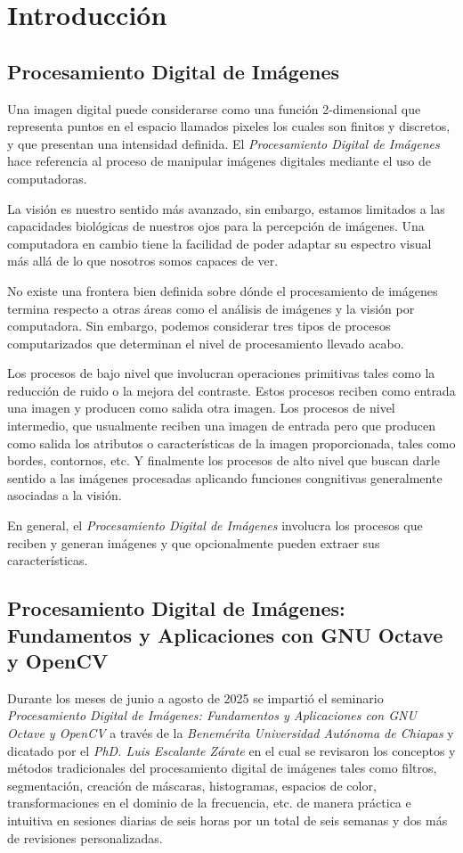 \chapter{Introducción}

\section{Procesamiento Digital de Imágenes}
Una imagen digital puede considerarse como una función 2-dimensional que representa puntos en el espacio llamados pixeles los cuales son finitos y discretos, y que presentan una intensidad definida. El \textit{Procesamiento Digital de Imágenes} hace referencia al proceso de manipular imágenes digitales mediante el uso de computadoras.

La visión es nuestro sentido más avanzado, sin embargo, estamos limitados a las capacidades biológicas de nuestros ojos para la percepción de imágenes. Una computadora en cambio tiene la facilidad de poder adaptar su espectro visual más allá de lo que nosotros somos capaces de ver.

No existe una frontera bien definida sobre dónde el procesamiento de imágenes termina respecto a otras áreas como el análisis de imágenes y la visión por computadora. Sin embargo, podemos considerar tres tipos de procesos computarizados que determinan el nivel de procesamiento llevado acabo.

Los procesos de bajo nivel que involucran operaciones primitivas tales como la reducción de ruido o la mejora del contraste. Estos procesos reciben como entrada una imagen y producen como salida otra imagen. Los procesos de nivel intermedio, que usualmente reciben una imagen de entrada pero que producen como salida los atributos o características de la imagen proporcionada, tales como bordes, contornos, etc. Y finalmente los procesos de alto nivel que buscan darle sentido a las imágenes procesadas aplicando funciones congnitivas generalmente asociadas a la visión.

En general, el \textit{Procesamiento Digital de Imágenes} involucra los procesos que reciben y generan imágenes y que opcionalmente pueden extraer sus características. \cite{gonzalez2008digital}

\section{Procesamiento Digital de Imágenes: Fundamentos y Aplicaciones con GNU Octave y OpenCV}
Durante los meses de junio a agosto de 2025 se impartió el seminario \textit{Procesamiento Digital de Imágenes: Fundamentos y Aplicaciones con GNU Octave y OpenCV} a través de la \textit{Benemérita Universidad Autónoma de Chiapas} y dicatado por el \textit{PhD. Luis Escalante Zárate} en el cual se revisaron los conceptos y métodos tradicionales del procesamiento digital de imágenes tales como filtros, segmentación, creación de máscaras, histogramas, espacios de color, transformaciones en el dominio de la frecuencia, etc. de manera práctica e intuitiva en sesiones diarias de seis horas por un total de seis semanas y dos más de revisiones personalizadas.

